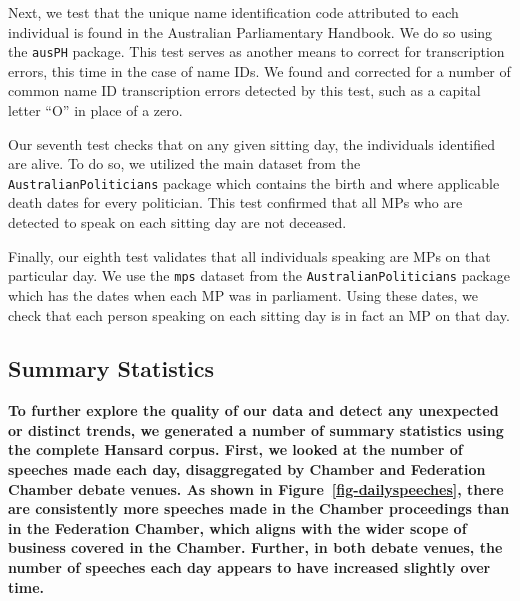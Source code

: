 \documentclass[
  letterpaper,
  DIV=11,
  numbers=noendperiod]{scrartcl}
\begin{document}
Next, we test that the unique name identification code attributed to
each individual is found in the Australian Parliamentary Handbook. We do
so using the \texttt{ausPH} package. This test serves as another means
to correct for transcription errors, this time in the case of name IDs.
We found and corrected for a number of common name ID transcription
errors detected by this test, such as a capital letter ``O'' in place of
a zero.

Our seventh test checks that on any given sitting day, the individuals
identified are alive. To do so, we utilized the main dataset from the
\texttt{AustralianPoliticians} package which contains the birth and
where applicable death dates for every politician. This test confirmed
that all MPs who are detected to speak on each sitting day are not
deceased.

Finally, our eighth test validates that all individuals speaking are MPs
on that particular day. We use the \texttt{mps} dataset from the
\texttt{AustralianPoliticians} package which has the dates when each MP
was in parliament. Using these dates, we check that each person speaking
on each sitting day is in fact an MP on that day.

\hypertarget{summary-statistics}{%
\subsection{Summary Statistics}\label{summary-statistics}}

\textbf{To further explore the quality of our data and detect any
unexpected or distinct trends, we generated a number of summary
statistics using the complete Hansard corpus. First, we looked at the
number of speeches made each day, disaggregated by Chamber and
Federation Chamber debate venues. As shown in
Figure~\ref{fig-dailyspeeches}, there are consistently more speeches
made in the Chamber proceedings than in the Federation Chamber, which
aligns with the wider scope of business covered in the Chamber. Further,
in both debate venues, the number of speeches each day appears to have
increased slightly over time.}
\end{document}
